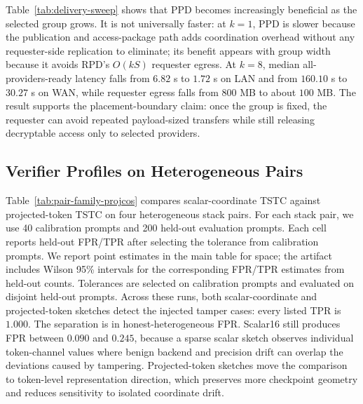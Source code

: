 \documentclass[sigplan,screen,review,anonymous]{acmart}
\begin{document}
Table~\ref{tab:delivery-sweep} shows that PPD becomes increasingly beneficial
as the selected group grows. It is not universally faster:
at \(k=1\), PPD is slower because the publication and access-package path adds
coordination overhead without any requester-side replication to eliminate; its
benefit appears with group width because it avoids RPD's \(O(kS)\) requester
egress. At \(k=8\), median all-providers-ready latency
falls from \(6.82\) s to \(1.72\) s on LAN and from \(160.10\) s to
\(30.27\) s on WAN, while requester egress falls from \(800\) MB to about
\(100\) MB. The result supports the placement-boundary claim: once the group
is fixed, the requester can avoid repeated payload-sized transfers while still
releasing decryptable access only to selected providers.

\subsection{Verifier Profiles on Heterogeneous Pairs}
\label{subsec:eval-pair-family}

Table~\ref{tab:pair-family-projcos} compares scalar-coordinate TSTC against
projected-token TSTC on four heterogeneous stack pairs. For each stack pair,
we use 40 calibration prompts and 200 held-out evaluation prompts. Each cell
reports held-out FPR/TPR after selecting the tolerance from calibration
prompts. We report point estimates in the main table for space; the artifact
includes Wilson 95\% intervals for the corresponding FPR/TPR estimates from
held-out counts. Tolerances are selected on calibration prompts and evaluated on
disjoint held-out prompts.
Across these runs, both scalar-coordinate and projected-token sketches detect
the injected tamper cases: every listed TPR is \(1.000\). The separation is in
honest-heterogeneous FPR. Scalar16 still produces FPR between \(0.090\) and
\(0.245\), because a sparse scalar sketch observes individual token-channel
values where benign backend and precision drift can overlap the deviations
caused by tampering. Projected-token sketches move the comparison to
token-level representation direction, which preserves more checkpoint geometry
and reduces sensitivity to isolated coordinate drift.
\end{document}
